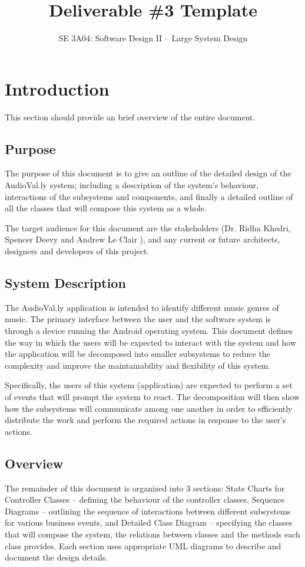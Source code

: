 \documentclass[]{article}
\title{Deliverable \#3 Template}
\author{SE 3A04: Software Design II -- Large System Design}
\date{}
\begin{document}
\maketitle	

\section{Introduction}
\label{sec:introduction}

This section should provide an brief overview of the entire document.

\subsection{Purpose}
\label{sub:purpose}

The purpose of this document is to give an outline of the detailed design of the AudioVal.ly system; including a description of the system's behaviour, interactions of the subsystems and components, and finally a detailed outline of all the classes that will compose this system as a whole.

The target audience for this document are the stakeholders (Dr. Ridha Khedri, Spencer Deevy and Andrew Le Clair ), and any current or future architects, designers and developers of this project.

\subsection{System Description}
\label{sub:system_description}

The AudioVal.ly application is intended to identify different music genres of music. The primary interface between the user and the software system is through a device running the Android
operating system. This document defines the way in which the users will be expected to interact with the system and how the application will be decomposed into smaller subsystems to reduce the complexity and improve the maintainability and flexibility of this system.

Specifically, the users of this system (application) are expected to perform a set of events that will prompt the system to react. The decomposition will then show how the subsystems will communicate among one another in order to efficiently distribute the work and perform the required actions in response to the user's actions.


\subsection{Overview}
\label{sub:overview}
The remainder of this document is organized into 3 sections: State Charts for Controller Classes -- defining the behaviour of the controller classes, Sequence Diagrams -- outlining the sequence of interactions between different subsystems for various business events, and Detailed Class Diagram -- specifying the classes that will compose the system, the relations between
classes and the methods each class provides. Each section uses appropriate UML diagrams to describe and document the design details.
\end{document}
